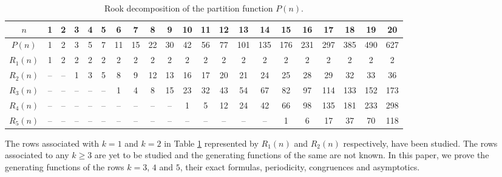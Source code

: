 \documentclass[12pt,reqno]{amsart}
\numberwithin{equation}{section}
\theoremstyle{plain}
\begin{document}
	\renewcommand{\arraystretch}{1.2}
	\begin{table}[h!]
		\centering
		\begin{tabular}{||c||c|c|c| c| c| c| c| c| c| c| c| c| c| c|c|c|c|c|c|c||} 
			\hline
			$n$ & 1 & 2 & 3 & 4 & 5 & 6 & 7 & 8 & 9 &10 &11 &12& 13 & 14&15&16&17&18&19&20\\
			\hline 
			$P(n)$&  1 & 2 & 3 & 5 & 7 & 11 & 15&22 &30 & 42 &56 & 77 &101& 135 & 176& 231& 297& 385 & 490& 627\\ 
			\hline
			\hline 
			$R_1(n)$& 1 &2 & 2 & 2 & 2 & 2 & 2 &2 & 2 &2 & 2 &2& 2 & 2&2&2&2&2&2&2\\
			\hline
			$R_2(n)$& -- & -- & 1& 3& 5 & 8 & 9 &12 & 13 &16 & 17 &20& 21 & 24&25&28&29&32&33&36\\ 
			\hline
			$R_3(n)$&-- &-- &--  & -- &-- & 1 & 4 & 8 & 15 & 23 & 32 & 43 & 54 & 67 & 82&97&114&133&152&173\\ 
			\hline
			$R_4(n)$&-- &-- &--  & -- &-- & -- & -- &-- & -- & 1 & 5 &12& 24 &42 &66&98&135&181&233&298\\ 
			\hline
			$R_5(n)$&-- &-- &--  & -- &-- & -- & -- &-- & -- &-- & -- &--& -- &--&1&6&17&37&70&118\\ 
			\hline
		\end{tabular}
		\caption{Rook decomposition of the partition function $P(n)$.}
		\label{table R}
	\end{table}
	
	The rows associated with $k=1$ and $k=2$ in Table \ref{table R} represented by $R_1(n)$ and $R_2(n)$ respectively, have been studied. The rows associated to any $k\geq3$ are yet to be studied and the generating functions of the same are not known. In this paper, we prove the generating functions of the rows $k=3$, $4$ and $5$, their exact formulas, periodicity, congruences and asymptotics. 
	
\end{document}
